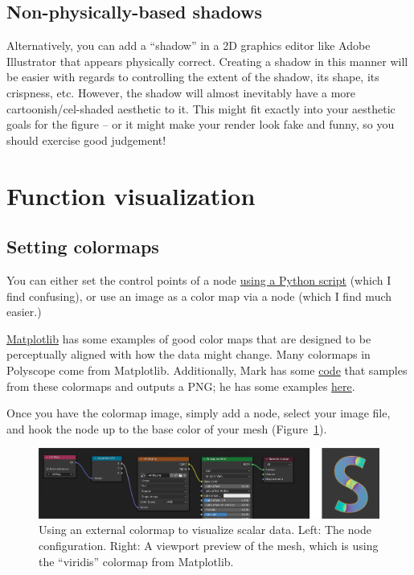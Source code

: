 \documentclass[10pt]{article}
\newcommand{\obj}[1]{\menu{\color{magenta} #1}}
\begin{document}
\subsection{Non-physically-based shadows}
\label{sec:CartoonShadows}
Alternatively, you can add a ``shadow'' in a 2D graphics editor like Adobe Illustrator that appears physically correct. Creating a shadow in this manner will be easier with regards to controlling the extent of the shadow, its shape, its crispness, etc. However, the shadow will almost inevitably have a more cartoonish/cel-shaded aesthetic to it. This might fit exactly into your aesthetic goals for the figure -- or it might make your render look fake and funny, so you should exercise good judgement! %

\section{Function visualization}
\label{sec:FunctionVisualization}

\subsection{Setting colormaps}
You can either set the control points of a \obj{Color Ramp} node \href{https://blender.stackexchange.com/a/261366}{using a Python script} (which I find confusing), or use an image as a color map via a \obj{Image Texture} node (which I find much easier.) 

\href{https://matplotlib.org/stable/gallery/color/colormap_reference.html}{Matplotlib} has some examples of good color maps that are designed to be perceptually aligned with how the data might change. Many colormaps in Polyscope come from Matplotlib. Additionally, Mark has some \href{https://github.com/MarkGillespie/geoptic.js/blob/main/misc/generate_colormap_constant.py}{code} that samples from these colormaps and outputs a PNG; he has some examples \href{https://github.com/MarkGillespie/geoptic.js/tree/main/img/colormaps}{here}. 

Once you have the colormap image, simply add a \obj{Image Texture} node, select your image file, and hook the node up to the base color of your mesh (Figure~\ref{fig:color-map-texture}).
\begin{figure}[H]
    \centering
    \captionsetup{width=0.8\linewidth}
    \includegraphics[width=0.9\linewidth]{images/color-map-texture.png}
    \caption{Using an external colormap to visualize scalar data. Left: The node configuration. Right: A viewport preview of the mesh, which is using the ``viridis'' colormap from Matplotlib.}
    \label{fig:color-map-texture}
\end{figure}
\end{document}
